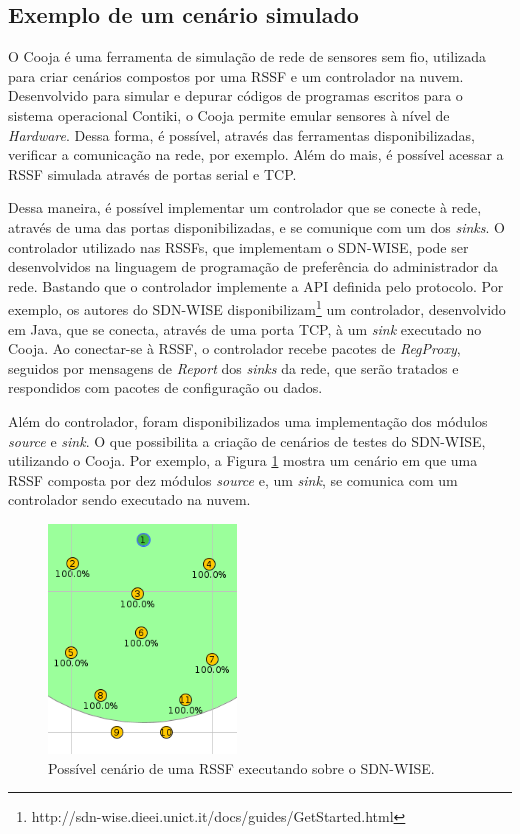 \subsection{Exemplo de um cenário simulado}

 O Cooja é uma ferramenta de simulação de rede de sensores sem fio, utilizada para criar cenários compostos por uma \ac{RSSF} e um controlador na nuvem. Desenvolvido para simular e depurar códigos de programas escritos para o sistema operacional Contiki, o Cooja permite emular sensores à nível de \textit{Hardware}. Dessa forma, é possível, através das ferramentas disponibilizadas, verificar a comunicação na rede, por exemplo. Além do mais, é possível acessar a \ac{RSSF} simulada através de portas serial e \ac{TCP}.

Dessa maneira, é possível implementar um controlador que se conecte à rede, através de uma das portas disponibilizadas, e se comunique com um dos \textit{sinks}. O controlador utilizado nas \ac{RSSF}s, que implementam o \ac{SDN-WISE}, pode ser desenvolvidos na linguagem de programação de preferência do administrador da rede. Bastando que o controlador implemente a \ac{API} definida pelo protocolo. Por exemplo, os autores do \ac{SDN-WISE} disponibilizam\footnote{http://sdn-wise.dieei.unict.it/docs/guides/GetStarted.html} um controlador, desenvolvido em Java, que se conecta, através de uma porta \ac{TCP}, à um \textit{sink} executado no Cooja. Ao conectar-se à \ac{RSSF}, o controlador recebe pacotes de \textit{RegProxy}, seguidos por mensagens de \textit{Report} dos \textit{sinks} da rede, que serão tratados e respondidos com pacotes de configuração ou dados.

Além do controlador, foram disponibilizados uma implementação dos módulos \textit{source} e \textit{sink}. O que possibilita a criação de cenários de testes do \ac{SDN-WISE}, utilizando o Cooja. Por exemplo, a Figura \ref{disposicaoModulosSimulation} mostra um cenário em que uma \ac{RSSF} composta por dez módulos \textit{source} e, um \textit{sink}, se comunica com um controlador sendo executado na nuvem. 

\begin{figure}[!htb]
    \centering
    \includegraphics[width=5cm]{figs/disposicaoModulosSimulation.png}
    \caption{Possível cenário de uma \ac{RSSF} executando sobre o \ac{SDN-WISE}.}
    \label{disposicaoModulosSimulation}
\end{figure}

